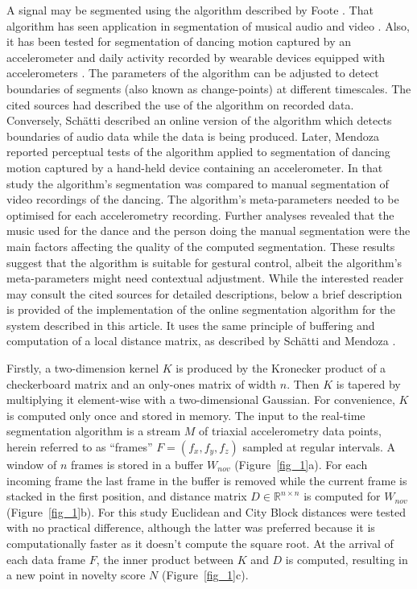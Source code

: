 \documentclass{nime-alternate_MANUSCRIPT} %
\begin{document}
A signal may be segmented using the algorithm described by Foote \cite{Foote_2000}. That algorithm has seen application in segmentation of musical audio and video \cite{Foote_Cooper_2003, Tardieu_etal_2009}. Also, it has been tested for segmentation of dancing motion captured by an accelerometer \cite{Mendoza_Thompson_2017} and daily activity recorded by wearable devices equipped with accelerometers \cite{Mendoza_etal_2022, Rodrigues_Probst_Gamboa_2021}. The parameters of the algorithm can be adjusted to detect boundaries of segments (also known as change-points) at different timescales. The cited sources had described the use of the algorithm on recorded data. Conversely, Schätti \cite{Schatti_2007} described an online version of the algorithm which detects boundaries of audio data while the data is being produced. Later,  
Mendoza \cite{Mendoza_2022} 
reported perceptual tests of the algorithm applied to segmentation of dancing motion captured by a hand-held device containing an accelerometer. In that study the algorithm's segmentation was compared to manual segmentation of video recordings of the dancing. The algorithm's meta-parameters needed to be optimised for each accelerometry recording. Further analyses revealed that the music used for the dance and the person doing the manual segmentation were the main factors affecting the quality of the computed segmentation. These results suggest that the algorithm is suitable for gestural control, albeit the algorithm's meta-parameters might need contextual adjustment. While the interested reader may consult the cited sources for detailed descriptions, below a brief description is provided of the implementation of the online segmentation algorithm for the system described in this article. It uses the same principle of buffering and computation of a local distance matrix, as described by Schätti \cite{Schatti_2007} and 
Mendoza \cite{Mendoza_2022}.

Firstly, a two-dimension kernel $K$ is produced by the Kronecker product of a checkerboard matrix and an only-ones matrix of width $n$. Then $K$ is tapered by multiplying it element-wise with a two-dimensional Gaussian. For convenience, $K$ is computed only once and stored in memory. The input to the real-time segmentation algorithm is a stream $M$ of triaxial accelerometry data points, herein referred to as “frames” $F=(f_x,f_y,f_z )$ sampled at regular intervals. A window of $n$ frames is stored in a buffer $W_{nov}$ (Figure~\ref{fig_1}a). For each incoming frame the last frame in the buffer is removed while the current frame is stacked in the first position, and distance matrix $D \in \mathbb{R}^{n \times n}$  is computed for $W_{nov}$ (Figure~\ref{fig_1}b). For this study Euclidean and City Block distances were tested with no practical difference, although the latter was preferred because it is computationally faster as it doesn't compute the square root. At the arrival of each data frame $F$, the inner product between $K$ and $D$ is computed, resulting in a new point in novelty score $N$ (Figure~\ref{fig_1}c). 
\end{document}
